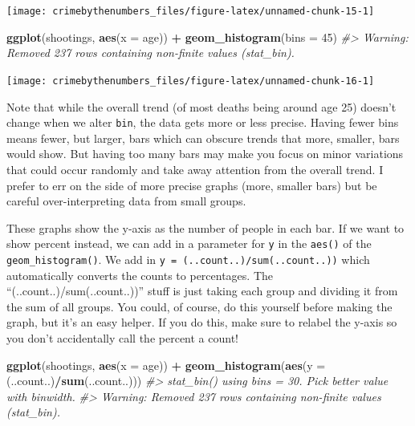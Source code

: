 \documentclass[
  12pt,
]{book}
\newenvironment{Shaded}{\begin{snugshade}}{\end{snugshade}}
\newcommand{\CommentTok}[1]{\textcolor[rgb]{0.37,0.37,0.37}{\textit{#1}}}
\newcommand{\DataTypeTok}[1]{\textcolor[rgb]{0.27,0.27,0.27}{#1}}
\newcommand{\DecValTok}[1]{\textcolor[rgb]{0.06,0.06,0.06}{#1}}
\newcommand{\KeywordTok}[1]{\textcolor[rgb]{0.27,0.27,0.27}{\textbf{#1}}}
\newcommand{\NormalTok}[1]{#1}
\newcommand{\OperatorTok}[1]{\textcolor[rgb]{0.43,0.43,0.43}{\textbf{#1}}}
\newcommand{\StringTok}[1]{\textcolor[rgb]{0.5,0.5,0.5}{#1}}
\begin{document}
\begin{center}\texttt{[image: crimebythenumbers\_files/figure-latex/unnamed-chunk-15-1]} \end{center}

\begin{Shaded}
\begin{Highlighting}[]
\KeywordTok{ggplot}\NormalTok{(shootings, }\KeywordTok{aes}\NormalTok{(}\DataTypeTok{x =}\NormalTok{ age)) }\OperatorTok{+}\StringTok{ }
\StringTok{  }\KeywordTok{geom\_histogram}\NormalTok{(}\DataTypeTok{bins =} \DecValTok{45}\NormalTok{)}
\CommentTok{\#> Warning: Removed 237 rows containing non{-}finite values (stat\_bin).}
\end{Highlighting}
\end{Shaded}

\begin{center}\texttt{[image: crimebythenumbers\_files/figure-latex/unnamed-chunk-16-1]} \end{center}

Note that while the overall trend (of most deaths being around age 25) doesn't change when we alter \texttt{bin}, the data gets more or less precise. Having fewer bins means fewer, but larger, bars which can obscure trends that more, smaller, bars would show. But having too many bars may make you focus on minor variations that could occur randomly and take away attention from the overall trend. I prefer to err on the side of more precise graphs (more, smaller bars) but be careful over-interpreting data from small groups.

These graphs show the y-axis as the number of people in each bar. If we want to show percent instead, we can add in a parameter for \texttt{y} in the \texttt{aes()} of the \texttt{geom\_histogram()}. We add in \texttt{y\ =\ (..count..)/sum(..count..))} which automatically converts the counts to percentages. The ``(..count..)/sum(..count..))'' stuff is just taking each group and dividing it from the sum of all groups. You could, of course, do this yourself before making the graph, but it's an easy helper. If you do this, make sure to relabel the y-axis so you don't accidentally call the percent a count!

\begin{Shaded}
\begin{Highlighting}[]
\KeywordTok{ggplot}\NormalTok{(shootings, }\KeywordTok{aes}\NormalTok{(}\DataTypeTok{x =}\NormalTok{ age)) }\OperatorTok{+}\StringTok{ }
\StringTok{  }\KeywordTok{geom\_histogram}\NormalTok{(}\KeywordTok{aes}\NormalTok{(}\DataTypeTok{y =}\NormalTok{ (..count..)}\OperatorTok{/}\KeywordTok{sum}\NormalTok{(..count..)))}
\CommentTok{\#> \textasciigrave{}stat\_bin()\textasciigrave{} using \textasciigrave{}bins = 30\textasciigrave{}. Pick better value with \textasciigrave{}binwidth\textasciigrave{}.}
\CommentTok{\#> Warning: Removed 237 rows containing non{-}finite values (stat\_bin).}
\end{Highlighting}
\end{Shaded}
\end{document}
